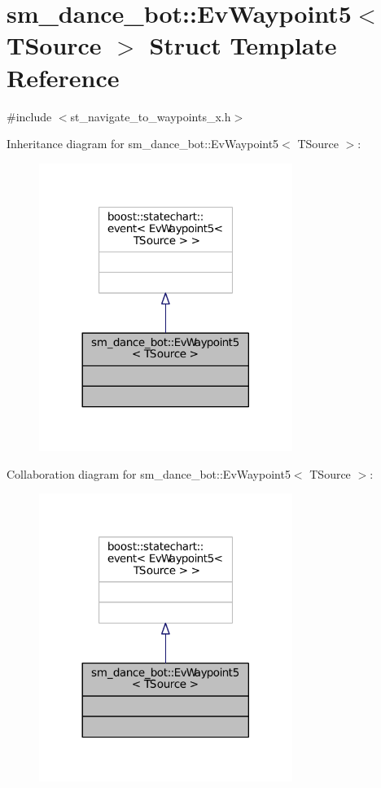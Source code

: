 \hypertarget{structsm__dance__bot_1_1EvWaypoint5}{}\section{sm\+\_\+dance\+\_\+bot\+:\+:Ev\+Waypoint5$<$ T\+Source $>$ Struct Template Reference}
\label{structsm__dance__bot_1_1EvWaypoint5}


{\ttfamily \#include $<$st\+\_\+navigate\+\_\+to\+\_\+waypoints\+\_\+x.\+h$>$}



Inheritance diagram for sm\+\_\+dance\+\_\+bot\+:\+:Ev\+Waypoint5$<$ T\+Source $>$\+:
\nopagebreak
\begin{figure}[H]
\begin{center}
\leavevmode
\includegraphics[width=233pt]{structsm__dance__bot_1_1EvWaypoint5__inherit__graph}
\end{center}
\end{figure}


Collaboration diagram for sm\+\_\+dance\+\_\+bot\+:\+:Ev\+Waypoint5$<$ T\+Source $>$\+:
\nopagebreak
\begin{figure}[H]
\begin{center}
\leavevmode
\includegraphics[width=233pt]{structsm__dance__bot_1_1EvWaypoint5__coll__graph}
\end{center}
\end{figure}


